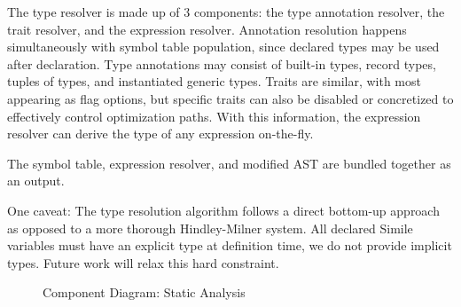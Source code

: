 The type resolver is made up of 3 components: the type annotation resolver, the trait resolver, and the expression resolver. Annotation resolution happens simultaneously with symbol table population, since declared types may be used after declaration. Type annotations may consist of built-in types, record types, tuples of types, and instantiated generic types. Traits are similar, with most appearing as flag options, but specific traits can also be disabled or concretized to effectively control optimization paths. With this information, the expression resolver can derive the type of any expression on-the-fly.

The symbol table, expression resolver, and modified AST are bundled together as an output.

One caveat: The type resolution algorithm follows a direct bottom-up approach as opposed to a more thorough Hindley-Milner system. All declared Simile variables must have an explicit type at definition time, we do not provide implicit types. Future work will relax this hard constraint.


\begin{figure}[H]
  \centering
  \caption{Component Diagram: Static Analysis}
  \label{fig:componentStaticAnalysis}
\end{figure}

